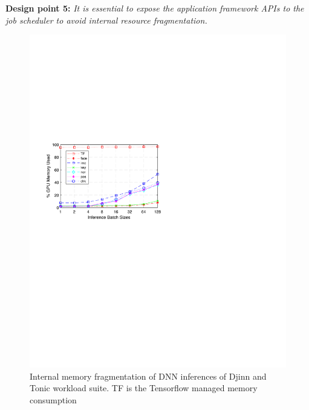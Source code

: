 \textbf{Design point 5:} \textit{It is essential to expose the application framework APIs to the job scheduler to avoid internal resource fragmentation.}

\begin{figure}
  \centering
  \includegraphics[width=.9\linewidth]{results/mem-fragmentation.pdf}
  \vspace{-2mm}
  \caption{Internal memory fragmentation of DNN inferences of Djinn and Tonic workload suite. TF is the Tensorflow managed memory consumption}
  \label{fig:tf-frag}
\end{figure}




